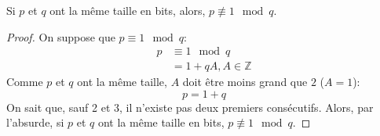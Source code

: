 	\begin{property}{Si $p$ et $q$ ont la même taille en bits, alors, $p \not\equiv 1\mod{q}$.}
		\begin{proof}
			On suppose que $p \equiv1\mod{q}$:
			\begin{align*}
				p&\equiv 1 \mod{q} \\
				&=1+qA, A\in\mathbb{Z}
			\end{align*}
			Comme $p$ et $q$ ont la même taille, $A$ doit être moins grand que $2$ ($A = 1$):
			$$p = 1+q$$
			On sait que, sauf 2 et 3, il n'existe pas deux premiers consécutifs. Alors, par l'absurde, 
			si $p$ et $q$ ont la même taille en bits, $p\not\equiv1\mod{q}$.
		\end{proof}
	\end{property}



